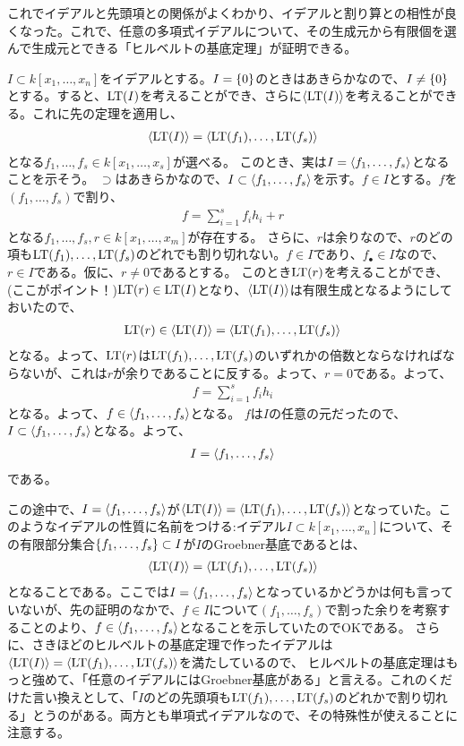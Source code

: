 \documentclass[9pt]{ltjsarticle}
\begin{document}
これでイデアルと先頭項との関係がよくわかり、イデアルと割り算との相性が良くなった。これで、任意の多項式イデアルについて、その生成元から有限個を選んで生成元とできる「ヒルベルトの基底定理」が証明できる。
\begin{myproof}
  $I\subset k[x_1,\dots,x_n]$をイデアルとする。$I=\{0\}$のときはあきらかなので、$I\neq \{0\}$とする。すると、${\rm LT}(I)$を考えることができ、さらに$\left\langle {\rm LT}(I) \right\rangle$を考えることができる。これに先の定理を適用し、
  \begin{align}
    \left\langle {\rm LT}(I) \right\rangle = \left\langle {\rm LT}(f_1),\dots,{\rm LT}(f_s) \right\rangle
  \end{align}
  となる$f_1,\dots,f_s \in k[x_1,\dots,x_s]$が選べる。
  このとき、実は$I = \left\langle f_1,\dots,f_s \right\rangle$となることを示そう。
  $\supset$はあきらかなので、$I\subset \left\langle f_1,\dots,f_s \right\rangle$を示す。$f \in I$とする。$f$を$(f_1,\dots,f_s)$で割り、
  \begin{align}
    f = \sum_{i=1}^s f_i h_i + r
  \end{align}
  となる$f_1,\dots,f_s,r \in k[x_1,\dots,x_m]$が存在する。
  さらに、$r$は余りなので、$r$のどの項も${\rm LT}(f_1),\dots,{\rm LT}(f_s)$のどれでも割り切れない。$f\in I$であり、$f_\bullet \in I$なので、
  $r\in I$である。仮に、$r\neq 0$であるとする。
  このとき${\rm LT}(r)$を考えることができ、(ここがポイント！)${\rm LT}(r) \in {\rm LT}(I)$となり、$\left\langle {\rm LT}(I) \right\rangle$は有限生成となるようにしておいたので、
  \begin{align}
    {\rm LT}(r) \in \left\langle {\rm LT}(I) \right\rangle = \left\langle {\rm LT}(f_1),\dots,{\rm LT}(f_s) \right\rangle
  \end{align}
  となる。よって、${\rm LT}(r)$は${\rm LT}(f_1),\dots,{\rm LT}(f_s)$のいずれかの倍数とならなければならないが、これは$r$が余りであることに反する。よって、$r=0$である。よって、
  \begin{align}
    f= \sum_{i=1}^s f_i h_i
  \end{align}
  となる。よって、$f\in \left\langle f_1,\dots,f_s \right\rangle$となる。
  $f$は$I$の任意の元だったので、$I\subset \left\langle f_1,\dots,f_s \right\rangle$となる。よって、
  \begin{align}
    I = \left\langle f_1,\dots,f_s \right\rangle
  \end{align}
  である。
\end{myproof}

この途中で、$I=\left\langle f_1,\dots,f_s \right\rangle$が$\left\langle {\rm LT}(I) \right\rangle = \left\langle {\rm LT}(f_1),\dots,{\rm LT}(f_s) \right\rangle$となっていた。このようなイデアルの性質に名前をつける:イデアル$I\subset k[x_1,\dots,x_n]$について、その有限部分集合$\left\{f_1,\dots,f_s\right\} \subset I$が$I$のGroebner基底であるとは、
\begin{align}
  \left\langle {\rm LT}(I) \right\rangle = \left\langle {\rm LT}(f_1),\dots,{\rm LT}(f_s) \right\rangle
\end{align}
となることである。ここでは$I=\left\langle f_1,\dots,f_s \right\rangle$となっているかどうかは何も言っていないが、先の証明のなかで、$f\in I$について$(f_1,\dots,f_s)$で割った余りを考察することのより、$f\in \left\langle f_1,\dots,f_s \right\rangle$となることを示していたのでOKである。
さらに、さきほどのヒルベルトの基底定理で作ったイデアルは$\left\langle {\rm LT}(I) \right\rangle=\left\langle {\rm LT}(f_1),\dots,{\rm LT}(f_s) \right\rangle$を満たしているので、
ヒルベルトの基底定理はもっと強めて、「任意のイデアルにはGroebner基底がある」と言える。これのくだけた言い換えとして、「$I$のどの先頭項も${\rm LT}(f_1),\dots,{\rm LT}(f_s)$のどれかで割り切れる」とうのがある。両方とも単項式イデアルなので、その特殊性が使えることに注意する。
\end{document}
